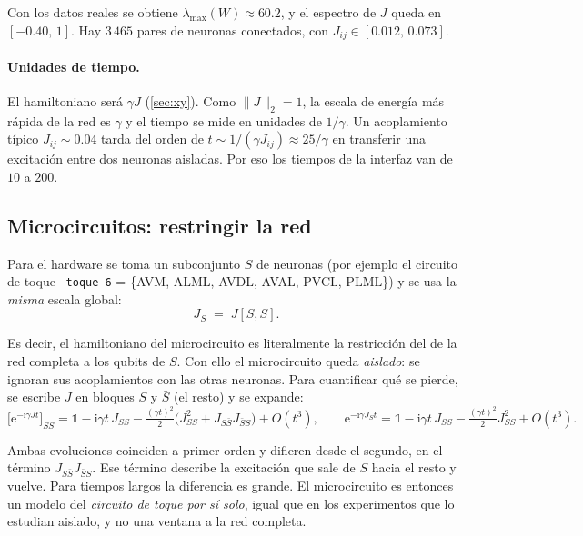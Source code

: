 \documentclass[11pt,a4paper]{article}
\newcommand{\e}{\mathrm{e}}
\newcommand{\ii}{\mathrm{i}}
\newcommand{\code}[1]{\texttt{#1}}
\theoremstyle{plain}
\theoremstyle{definition}
\theoremstyle{remark}
\begin{document}
Con los datos reales se obtiene $\lambda_{\max}(W)\approx 60.2$, y el espectro de $J$ queda en $[-0.40,\,1]$. Hay $3\,465$ pares de neuronas conectados, con $J_{ij}\in[0.012,\,0.073]$.

\paragraph{Unidades de tiempo.} El hamiltoniano será $\gamma J$ (\cref{sec:xy}). Como $\lVert J\rVert_2=1$, la escala de energía más rápida de la red es $\gamma$ y el tiempo se mide en unidades de $1/\gamma$. Un acoplamiento típico $J_{ij}\sim0.04$ tarda del orden de $t\sim 1/(\gamma J_{ij})\approx 25/\gamma$ en transferir una excitación entre dos neuronas aisladas. Por eso los tiempos de la interfaz van de $10$ a $200$.

\subsection{Microcircuitos: restringir la red}
\label{subsec:microcircuitos}

Para el hardware se toma un subconjunto $S$ de neuronas (por ejemplo el circuito de toque~\cite{chalfie1985} \code{toque-6} = \{AVM, ALML, AVDL, AVAL, PVCL, PLML\}) y se usa la \emph{misma} escala global:
\begin{equation}
J_S \;=\; J[S,S].
\end{equation}

Es decir, el hamiltoniano del microcircuito es literalmente la restricción del de la red completa a los qubits de $S$. Con ello el microcircuito queda \emph{aislado}: se ignoran sus acoplamientos con las otras neuronas. Para cuantificar qué se pierde, se escribe $J$ en bloques $S$ y $\bar S$ (el resto) y se expande:
\begin{equation}
\bigl[\e^{-\ii\gamma Jt}\bigr]_{SS}
= \mathbb 1 - \ii\gamma t\,J_{SS} - \tfrac{(\gamma t)^2}{2}\bigl(J_{SS}^2 + J_{S\bar S}J_{\bar S S}\bigr) + O(t^3),
\qquad
\e^{-\ii\gamma J_S t} = \mathbb 1 - \ii\gamma t\,J_{SS} - \tfrac{(\gamma t)^2}{2}J_{SS}^2 + O(t^3).
\end{equation}

Ambas evoluciones coinciden a primer orden y difieren desde el segundo, en el término $J_{S\bar S}J_{\bar SS}$. Ese término describe la excitación que sale de $S$ hacia el resto y vuelve. Para tiempos largos la diferencia es grande. El microcircuito es entonces un modelo del \emph{circuito de toque por sí solo}, igual que en los experimentos que lo estudian aislado, y no una ventana a la red completa.
\end{document}

